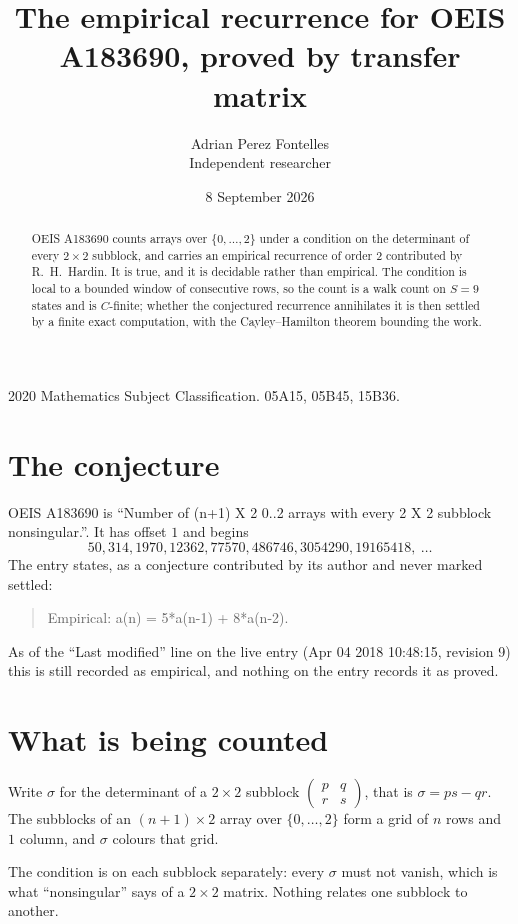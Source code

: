 \documentclass[11pt,a4paper]{article}
\title{The empirical recurrence for OEIS A183690, proved by transfer matrix}
\author{Adrian Perez Fontelles\\ \small Independent researcher}
\date{8 September 2026}
\theoremstyle{plain}
\theoremstyle{definition}
\begin{document}
\maketitle

\begin{abstract}
OEIS A183690 counts arrays over $\{0,\dots,2\}$ under a condition on the determinant of every
$2\times2$ subblock, and carries an empirical recurrence of order $2$ contributed by
R.~H.~Hardin. It is true, and it is decidable rather than empirical. The condition is local to
a bounded window of consecutive rows, so the count is a walk count on $S=9$ states and is
$C$-finite; whether the conjectured recurrence annihilates it is then settled by a finite exact
computation, with the Cayley--Hamilton theorem bounding the work.
\end{abstract}

\noindent\small 2020 Mathematics Subject Classification. 05A15, 05B45, 15B36.\normalsize

\section{The conjecture}

OEIS A183690 is ``Number of (n+1) X 2 0..2 arrays with every 2 X 2 subblock nonsingular.''. It has offset $1$ and begins
\[
50, 314, 1970, 12362, 77570, 486746, 3054290, 19165418,\ \dots
\]
The entry states, as a conjecture contributed by its author and never marked settled:
\begin{quote}
Empirical: a(n) = 5*a(n-1) + 8*a(n-2).
\end{quote}
As of the ``Last modified'' line on the live entry (Apr 04 2018 10:48:15, revision 9) this is still
recorded as empirical, and nothing on the entry records it as proved.

\section{What is being counted}

Write $\sigma$ for the determinant of a $2\times2$ subblock
$\begin{pmatrix}p&q\\r&s\end{pmatrix}$, that is $\sigma=ps-qr$. The subblocks of an
$(n+1)\times2$ array over $\{0,\dots,2\}$ form a grid of $n$ rows and $1$
column, and $\sigma$ colours that grid.

The condition is on each subblock separately: every $\sigma$ must not vanish, which is what
``nonsingular'' says of a $2\times2$ matrix. Nothing
relates one subblock to another.
\end{document}
